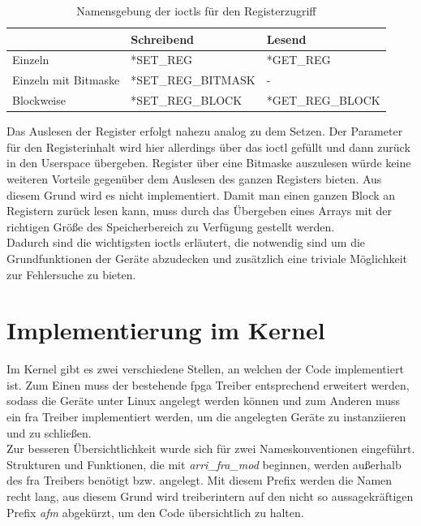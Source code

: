 \begin{table}
\centering	
\begin{tabular}[h]{l|l|l}
	& Schreibend & Lesend \\
	\hline
	Einzeln & *SET\_REG & *GET\_REG\\
	\hline
	Einzeln mit Bitmaske & *SET\_REG\_BITMASK & - \\
	\hline
	Blockweise & *SET\_REG\_BLOCK & *GET\_REG\_BLOCK\\
\end{tabular}
\caption{Namensgebung der \ac{ioctl}s für den Registerzugriff} \label{tab:ioctl}
\end{table}


Das Auslesen der Register erfolgt nahezu analog zu dem Setzen. Der Parameter für den Registerinhalt wird hier allerdings über das \ac{ioctl} gefüllt und dann zurück in den Userspace übergeben. 
Register über eine Bitmaske auszulesen würde keine weiteren Vorteile gegenüber dem Auslesen des ganzen Registers bieten. Aus diesem Grund wird es nicht implementiert.  
Damit man einen ganzen Block an Registern zurück lesen kann, muss durch das Übergeben eines Arrays mit der richtigen Größe des Speicherbereich zu Verfügung gestellt werden.\\

Dadurch sind die wichtigsten \ac{ioctl}s erläutert, die notwendig sind um die Grundfunktionen der Geräte abzudecken und zusätzlich eine triviale Möglichkeit zur Fehlersuche zu bieten.

\section{Implementierung im Kernel}\label{sec:kernel}
Im Kernel gibt es zwei verschiedene Stellen, an welchen der Code implementiert ist. Zum Einen muss der bestehende \ac{fpga} Treiber entsprechend erweitert werden, sodass die Geräte unter Linux angelegt werden können und zum Anderen muss ein \ac{fra} Treiber implementiert werden, um die angelegten Geräte zu instanziieren und zu schließen. \\

Zur besseren Übersichtlichkeit wurde sich für zwei Nameskonventionen eingeführt. Strukturen und Funktionen, die mit \textit{arri\_fra\_mod} beginnen, werden außerhalb des \ac{fra} Treibers benötigt bzw. angelegt. Mit diesem Prefix werden die Namen recht lang, aus diesem Grund wird treiberintern auf den nicht so aussagekräftigen Prefix \textit{afm} abgekürzt, um den Code übersichtlich zu halten.



